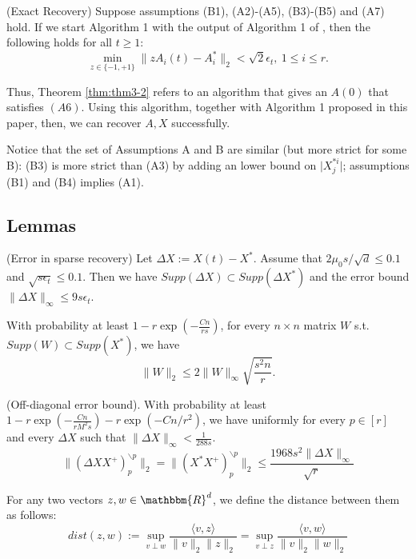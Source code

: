 \begin{corollary}
(Exact Recovery) Suppose assumptions (B1), (A2)-(A5), (B3)-(B5) and (A7) hold. If we start Algorithm 1 with the output of Algorithm 1 of \cite{ref1}, then the following holds for all $t\geq 1$:
\begin{equation*}
\min_{z\in \{-1,+1\}}\lVert zA_i(t)-A_i^*\rVert_2<\sqrt{2}\epsilon_t,~1\leq i \leq r.
\end{equation*}
\label{cor:cor3-1}
\end{corollary}

Thus, Theorem \ref{thm:thm3-2} refers to an algorithm that gives an $A(0)$ that satisfies $(A6)$. Using this algorithm, together with Algorithm 1 proposed in this paper, then, we can recover $A,X$ successfully.

Notice that the set of Assumptions A and B are similar (but more strict for some B): (B3) is more strict than (A3) by adding an lower bound on $\lvert X_j^{*i} \rvert$; assumptions (B1) and (B4) implies (A1).

\subsection{Lemmas}
\begin{lemma}
(Error in sparse recovery) Let $\Delta X:=X(t)-X^*$. Assume that $2\mu_0s/\sqrt{d}\leq 0.1$ and $\sqrt{s\epsilon_t}\leq 0.1$. Then we have $Supp(\Delta X) \subset Supp(\Delta X^*)$ and the error bound $\lVert \Delta X \rVert_{\infty} \leq 9s\epsilon_t$.
\label{lemma:l1}
\end{lemma}
\begin{lemma}
With probability at least $1-r \exp(-\frac{Cn}{rs})$, for every $n\times n$ matrix $W$ s.t. $Supp(W)\subset Supp(X^*)$, we have
\begin{equation*}
\lVert W \rVert_2 \leq 2 \lVert W \rVert_{\infty}\sqrt{\frac{s^2n}{r}}.
\end{equation*}
\label{lemma:l2}
\end{lemma}

\begin{lemma}
(Off-diagonal error bound). With probability at least $1-r\exp(-\frac{Cn}{rM^2s})-r\exp(-Cn/r^2)$, we have uniformly for every $p\in [r]$ and every $\Delta X$ such that $\lVert \Delta X\rVert_{\infty}<\frac{1}{288s}$.
\begin{equation*}
\lVert (\Delta XX^{+})_p^{\backslash p} \rVert_2=\lVert (X^*X^{+})_p^{\backslash p} \rVert_2 \leq \frac{1968s^2\lVert \Delta X \rVert_{\infty}}{\sqrt{r}}
\end{equation*}
\label{lemma:l3}
\end{lemma}
\begin{definition}
For any two vectors $z,w\in \mathbbm{R}^d$, we define the distance between them as follows:
\begin{equation*}
dist(z,w):=\sup_{v\perp w}\frac{\langle v,z\rangle }{\lVert v \rVert_2\lVert z \rVert_2}=\sup_{v\perp z}\frac{\langle v,w\rangle }{\lVert v \rVert_2\lVert w \rVert_2}
\end{equation*}
\label{def:def1}
\end{definition}

